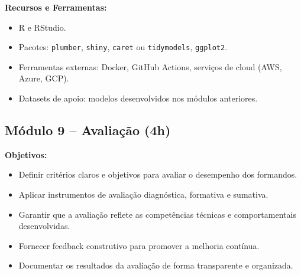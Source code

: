 \documentclass[12pt]{article}
\begin{document}
\textbf{Recursos e Ferramentas:}
\begin{itemize}
  \item R e RStudio.
  \item Pacotes: \texttt{plumber}, \texttt{shiny}, \texttt{caret} ou \texttt{tidymodels}, \texttt{ggplot2}.
  \item Ferramentas externas: Docker, GitHub Actions, serviços de cloud (AWS, Azure, GCP).
  \item Datasets de apoio: modelos desenvolvidos nos módulos anteriores.
\end{itemize}


\subsection*{Módulo 9 – Avaliação (4h)}

\textbf{Objetivos:}
\begin{itemize}
  \item Definir critérios claros e objetivos para avaliar o desempenho dos formandos.
  \item Aplicar instrumentos de avaliação diagnóstica, formativa e sumativa.
  \item Garantir que a avaliação reflete as competências técnicas e comportamentais desenvolvidas.
  \item Fornecer feedback construtivo para promover a melhoria contínua.
  \item Documentar os resultados da avaliação de forma transparente e organizada.
\end{itemize}
\end{document}
